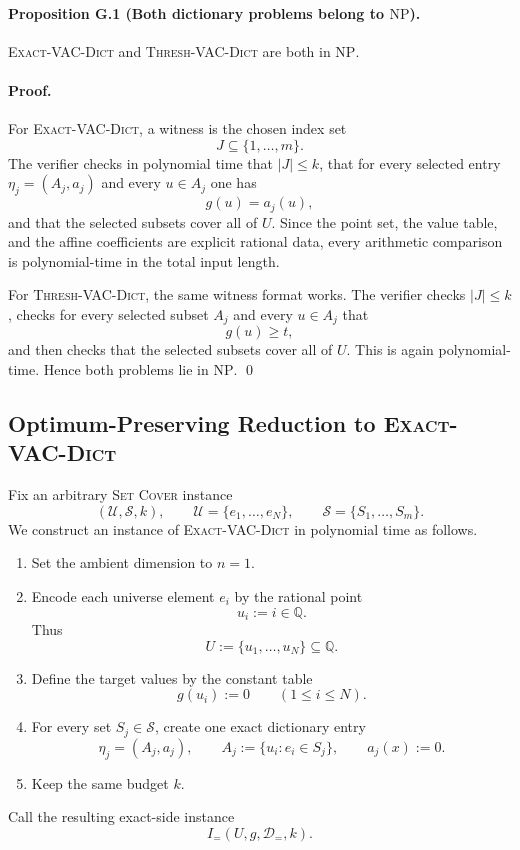\paragraph{Proposition G.1 (Both dictionary problems belong to $\mathrm{NP}$).}
\textsc{Exact-VAC-Dict} and \textsc{Thresh-VAC-Dict} are both in $\mathrm{NP}$.

\paragraph{Proof.}
For \textsc{Exact-VAC-Dict}, a witness is the chosen index set
\[
J\subseteq \{1,\dots,m\}.
\]
The verifier checks in polynomial time that $|J|\le k$, that for every selected entry $\eta_j=(A_j,a_j)$ and every $u\in A_j$ one has
\[
g(u)=a_j(u),
\]
and that the selected subsets cover all of $U$. Since the point set, the value table, and the affine coefficients are explicit rational data, every arithmetic comparison is polynomial-time in the total input length.

For \textsc{Thresh-VAC-Dict}, the same witness format works. The verifier checks $|J|\le k$, checks for every selected subset $A_j$ and every $u\in A_j$ that
\[
g(u)\ge t,
\]
and then checks that the selected subsets cover all of $U$. This is again polynomial-time. Hence both problems lie in $\mathrm{NP}$. \qed

\subsection{Optimum-Preserving Reduction to \textsc{Exact-VAC-Dict}}

Fix an arbitrary \textsc{Set Cover} instance
\[
(\mathcal U,\mathcal S,k),
\qquad
\mathcal U=\{e_1,\dots,e_N\},
\qquad
\mathcal S=\{S_1,\dots,S_m\}.
\]
We construct an instance of \textsc{Exact-VAC-Dict} in polynomial time as follows.
\begin{enumerate}
    \item Set the ambient dimension to $n=1$.
    \item Encode each universe element $e_i$ by the rational point
    \[
    u_i:=i\in\mathbb Q.
    \]
    Thus
    \[
    U:=\{u_1,\dots,u_N\}\subseteq\mathbb Q.
    \]
    \item Define the target values by the constant table
    \[
    g(u_i):=0
    \qquad (1\le i\le N).
    \]
    \item For every set $S_j\in\mathcal S$, create one exact dictionary entry
    \[
    \eta_j=(A_j,a_j),
    \qquad
    A_j:=\{u_i: e_i\in S_j\},
    \qquad
    a_j(x):=0.
    \]
    \item Keep the same budget $k$.
\end{enumerate}
Call the resulting exact-side instance
\[
I_{=}(U,g,\mathcal D_{=},k).
\]


